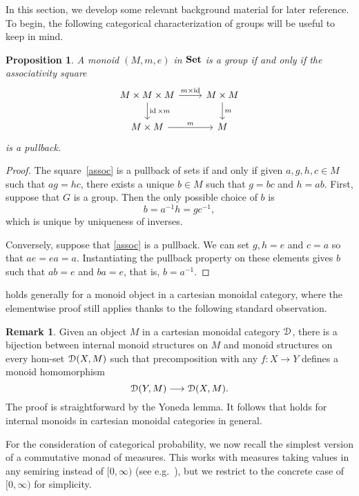\documentclass[a4paper,UKenglish,numberwithinsect,cleveref, autoref, thm-restate]{lipics-v2021}
\theoremstyle{plain} %
\newtheorem{myproposition}[mytheorem]{Proposition}
\theoremstyle{definition} %
\newtheorem{myremark}[mytheorem]{Remark}
\begin{document}
In this section, we develop some relevant background material for later reference.
To begin, the following categorical characterization of groups will be useful to keep in mind.
\begin{myproposition}\label{assoc_group}
 A monoid $(M,m,e)$ in $\mathbf{Set}$ is a group if and only if the associativity square
 \begin{equation}\label{assoc}
  \begin{tikzcd}
   M \times M \times M \ar{d}{\id\times m} \ar{r}{m\times\id} & M\times M \ar{d}{m} \\
   M\times M \ar{r}{m} & M
  \end{tikzcd}
 \end{equation}
 is a pullback.
\end{myproposition}
\begin{proof}
 The square~\eqref{assoc} is a pullback of sets if and only if given $a,g,h,c\in M$ such that $ag=hc$, there exists a unique $b\in M$ such that $g=bc$ and $h=ab$.
 First, suppose that $G$ is a group. Then the only possible choice of $b$ is 
 \[
  b = a^{-1}h = gc^{-1},
 \]
 which is unique by uniqueness of inverses. 
 
 Conversely, suppose that \eqref{assoc} is a pullback. We can set $g,h=e$ and $c=a$ so that $ae=ea=a$. 
 Instantiating the pullback property on these elements gives $b$ such that $ab=e$ and $ba=e$, that is, $b=a^{-1}$.
\end{proof}

 holds generally for a monoid object in a cartesian monoidal category, where the elementwise proof still applies thanks to the following standard observation.

\begin{myremark}
\label{yonedaremark}
	Given an object $M$ in a cartesian monoidal category $\mathcal{D}$, there is a bijection between internal monoid structures on $M$ and monoid structures on every hom-set $\mathcal{D}(X, M)$ such that precomposition with any $f : X \to Y$ defines a monoid homomorphism
	\[
		\mathcal{D}(Y, M) \longrightarrow \mathcal{D}(X, M).
	\]
	The proof is straightforward by the Yoneda lemma.
	It follows that  holds for internal monoids in cartesian monoidal categories in general.
\end{myremark}

For the consideration of categorical probability, we now recall the simplest version of a commutative monad of measures.
This works with measures taking values in any semiring instead of $[0,\infty)$ (see e.g.~\cite[Section~5.1]{coumans2013scalars}), but we restrict to the concrete case of $[0,\infty)$ for simplicity.
\end{document}
